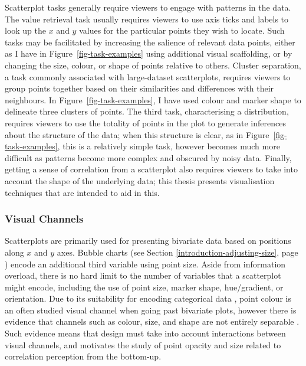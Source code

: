 \documentclass[../main.tex]{subfiles}
\begin{document}
Scatterplot tasks generally require viewers to engage with patterns in
the data. The value retrieval task usually requires viewers to use axis
ticks and labels to look up the \(x\) and \(y\) values for the
particular points they wish to locate. Such tasks may be facilitated by
increasing the salience of relevant data points, either as I have in
Figure~\ref{fig-task-examples} using additional visual scaffolding, or
by changing the size, colour, or shape of points relative to others.
Cluster separation, a task commonly associated with large-dataset
scatterplots, requires viewers to group points together based on their
similarities and differences with their neighbours. In
Figure~\ref{fig-task-examples}, I have used colour and marker shape to
delineate three clusters of points. The third task, characterising a
distribution, requires viewers to use the totality of points in the plot
to generate inferences about the structure of the data; when this
structure is clear, as in Figure~\ref{fig-task-examples}, this is a
relatively simple task, however becomes much more difficult as patterns
become more complex and obscured by noisy data. Finally, getting a sense
of correlation from a scatterplot also requires viewers to take into
account the shape of the underlying data; this thesis presents
visualisation techniques that are intended to aid in this.

\subsubsection{Visual Channels}\label{visual-channels}

Scatterplots are primarily used for presenting bivariate data based on
positions along \(x\) and \(y\) axes. Bubble charts (see Section
\ref{introduction-adjusting-size}, page
\pageref{introduction-adjusting-size}) encode an additional third
variable using point size. Aside from information overload, there is no
hard limit to the number of variables that a scatterplot might encode,
including the use of point size, marker shape, hue/gradient, or
orientation. Due to its suitability for encoding categorical data
\cite{kim_2018}, point colour is an often studied visual channel when
going past bivariate plots, however there is evidence that channels such
as colour, size, and shape are not entirely separable \cite{smart_2019}.
Such evidence means that design must take into account interactions
between visual channels, and motivates the study of point opacity and
size related to correlation perception from the bottom-up.
\end{document}
